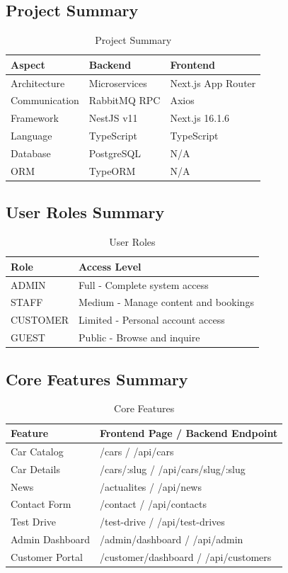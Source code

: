 \documentclass[12pt,a4paper]{article}
\begin{document}
\subsection{Project Summary}

\begin{table}[h]
\centering
\caption{Project Summary}
\begin{tabular}{@{}lll@{}}
\toprule
Aspect & Backend & Frontend \\
\midrule
Architecture & Microservices & Next.js App Router \\
Communication & RabbitMQ RPC & Axios \\
Framework & NestJS v11 & Next.js 16.1.6 \\
Language & TypeScript & TypeScript \\
Database & PostgreSQL & N/A \\
ORM & TypeORM & N/A \\
\bottomrule
\end{tabular}
\end{table}

\subsection{User Roles Summary}

\begin{table}[h]
\caption{User Roles}
\begin{tabular}{@{}ll@{}}
\toprule
Role & Access Level \\
\midrule
ADMIN & Full - Complete system access \\
STAFF & Medium - Manage content and bookings \\
CUSTOMER & Limited - Personal account access \\
GUEST & Public - Browse and inquire \\
\bottomrule
\end{tabular}
\end{table}

\subsection{Core Features Summary}

\begin{table}[h]
\centering
\caption{Core Features}
\begin{tabular}{@{}ll@{}}
\toprule
Feature & Frontend Page / Backend Endpoint \\
\midrule
Car Catalog & /cars / /api/cars \\
Car Details & /cars/:slug / /api/cars/slug/:slug \\
News & /actualites / /api/news \\
Contact Form & /contact / /api/contacts \\
Test Drive & /test-drive / /api/test-drives \\
Admin Dashboard & /admin/dashboard / /api/admin \\
Customer Portal & /customer/dashboard / /api/customers \\
\bottomrule
\end{tabular}
\end{table}
\end{document}
